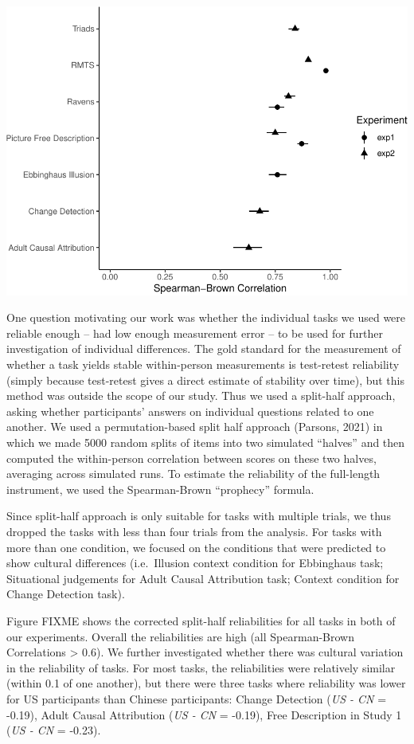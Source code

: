 \documentclass[
  man]{apa6}
\begin{document}
\includegraphics{CCRR_manuscript_files/figure-latex/unnamed-chunk-25-1.pdf}

One question motivating our work was whether the individual tasks we used were reliable enough -- had low enough measurement error -- to be used for further investigation of individual differences. The gold standard for the measurement of whether a task yields stable within-person measurements is test-retest reliability (simply because test-retest gives a direct estimate of stability over time), but this method was outside the scope of our study. Thus we used a split-half approach, asking whether participants' answers on individual questions related to one another. We used a permutation-based split half approach (Parsons, 2021) in which we made 5000 random splits of items into two simulated ``halves'' and then computed the within-person correlation between scores on these two halves, averaging across simulated runs. To estimate the reliability of the full-length instrument, we used the Spearman-Brown ``prophecy'' formula.

Since split-half approach is only suitable for tasks with multiple trials, we thus dropped the tasks with less than four trials from the analysis. For tasks with more than one condition, we focused on the conditions that were predicted to show cultural differences (i.e.~Illusion context condition for Ebbinghaus task; Situational judgements for Adult Causal Attribution task; Context condition for Change Detection task).

Figure FIXME shows the corrected split-half reliabilities for all tasks in both of our experiments. Overall the reliabilities are high (all Spearman-Brown Correlations \textgreater{} 0.6). We further investigated whether there was cultural variation in the reliability of tasks. For most tasks, the reliabilities were relatively similar (within 0.1 of one another), but there were three tasks where reliability was lower for US participants than Chinese participants: Change Detection (\emph{US - CN} = -0.19), Adult Causal Attribution (\emph{US - CN} = -0.19), Free Description in Study 1 (\emph{US - CN} = -0.23).
\end{document}
